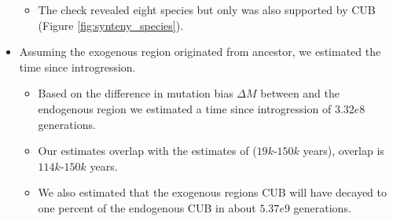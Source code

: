 \documentclass[12pt]{article}
\begin{document}
\begin{itemize}
	\begin{itemize}
		\item The check revealed eight species but only \gossypii was also supported by CUB (Figure \ref{fig:synteny_species}).
	\end{itemize}
	\item Assuming the exogenous region originated from \gossypii ancestor, we estimated the time since introgression.
	\begin{itemize}
		\item Based on the difference in mutation bias $\Delta M$ between \gossypii and the endogenous region we estimated a time since introgression of $3.32e8$ generations.
		\item Our estimates overlap with the estimates of \citep{friedrich2015} ($19k$-$150k$ years), overlap is $114k$-$150k$ years.
		\item We also estimated that the exogenous regions CUB will have decayed to one percent of the endogenous CUB in about $5.37e9$ generations.
	\end{itemize}
\end{itemize}
\end{document}
